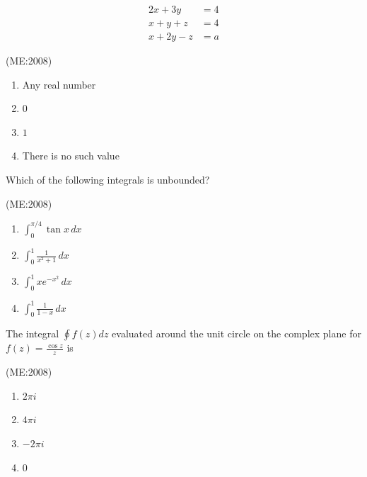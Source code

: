 		\begin{align}
			2x + 3y &= 4 \\
			x + y + z &= 4 \\
			x + 2y - z &= a
                 \end{align}
               
        \hfill{(ME:2008)}
        \begin{multicols}{2}
            \begin{enumerate}
                \item Any real number
                \item $0$
                \item $1$
                \item There is no such value
            \end{enumerate}
        \end{multicols}
    
    \item
        Which of the following integrals is unbounded?

        \hfill{(ME:2008)}
        \begin{multicols}{2}
            \begin{enumerate}
                \item $\int_0^{\pi/4} \tan x \, dx$
                \item $\int_0^1 \frac{1}{x^2+1} \, dx$
                \item $\int_0^1 xe^{-x^2} \, dx$
                \item $\int_0^1 \frac{1}{1-x} \, dx$\\
            \end{enumerate}
        \end{multicols}

    \item
        The integral $\oint f(z) dz$ evaluated around the unit circle on the complex plane for $f(z) = \frac{\cos z}{z}$ is
       
       \hfill{(ME:2008)}
        \begin{multicols}{4}
            \begin{enumerate}
                \item $2\pi i$
                \item $4\pi i$
                \item $-2\pi i$
                \item $0$
            \end{enumerate}
        \end{multicols}
    
